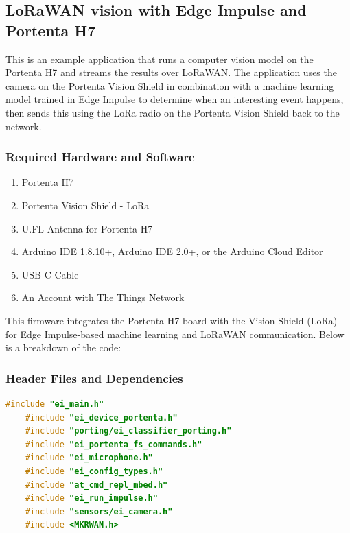 \subsection{LoRaWAN vision with Edge Impulse and Portenta H7}

This is an example application that runs a computer vision model on the Portenta H7 and streams the results over LoRaWAN. The application uses the camera on the Portenta Vision Shield in combination with a machine learning model trained in Edge Impulse to determine when an interesting event happens, then sends this using the LoRa radio on the Portenta Vision Shield back to the network. \cite{edge_impulse_portenta_lorawan:2025} \newline 


\subsubsection{Required Hardware and Software}

\begin{enumerate}
	\item Portenta H7
	\item Portenta Vision Shield - LoRa
	\item U.FL Antenna for Portenta H7 
	\item Arduino IDE 1.8.10+, Arduino IDE 2.0+, or the Arduino Cloud Editor
	\item USB-C Cable
	\item An Account with The Things Network \cite{edge_impulse_portenta_lorawan:2025}
\end{enumerate}

This firmware integrates the Portenta H7 board with the Vision Shield (LoRa) for Edge Impulse-based machine learning and LoRaWAN communication. Below is a breakdown of the code: \cite{edge_impulse_portenta_lorawan:2025}

\subsubsection{Header Files and Dependencies}

\begin{lstlisting}[language=C++, caption=Included Header Files]
	#include "ei_main.h"
	#include "ei_device_portenta.h"
	#include "porting/ei_classifier_porting.h"
	#include "ei_portenta_fs_commands.h"
	#include "ei_microphone.h"
	#include "ei_config_types.h"
	#include "at_cmd_repl_mbed.h"
	#include "ei_run_impulse.h"
	#include "sensors/ei_camera.h"
	#include <MKRWAN.h>
\end{lstlisting}

